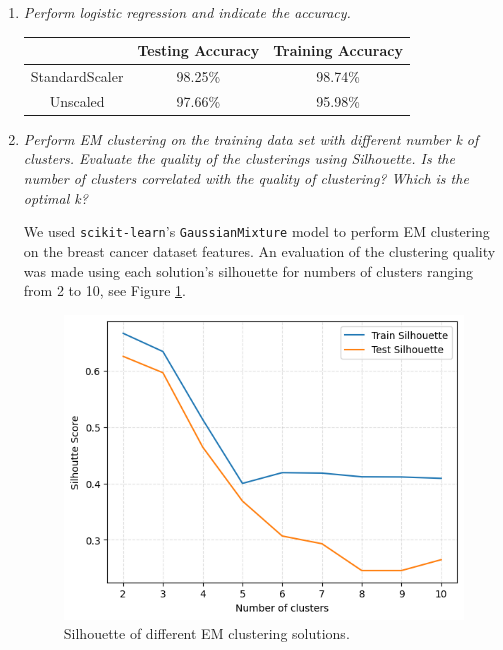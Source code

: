 \documentclass{article}
\begin{document}
\setcounter{page}{0}
\thispagestyle{empty}
\renewcommand{\thesection}{\Roman{section}}

\newpage





\begin{enumerate}

  \item \textit{Perform logistic regression and indicate the accuracy.}

\begin{table}[H]
    \centering
    \begin{tabular}{ccc}
        &Testing Accuracy & Training Accuracy \\ \hline
        StandardScaler &98.25\% & 98.74\% \\
        Unscaled &97.66\% & 95.98\%
    \end{tabular}
    \label{tab:log-accuracy}
\end{table}

  \item \textit{Perform EM clustering on the training data set with different number k of clusters. Evaluate
  the quality of the clusterings using Silhouette. Is the number of clusters correlated with the
  quality of clustering? Which is the optimal k?}

We used \texttt{scikit-learn}'s \texttt{GaussianMixture} model to perform EM
clustering on the breast cancer dataset features. An evaluation of the clustering quality was made
using each solution's silhouette for numbers of clusters ranging from 2 to 10, see Figure \ref{fig:silhouette-score}.

\begin{figure}[H]
  \centering
  \includegraphics[width=0.5\linewidth]{img/Silhouettes.png}
  \caption{Silhouette of different EM clustering solutions.}
  \label{fig:silhouette-score}
\end{figure}


\end{enumerate}
\end{document}
